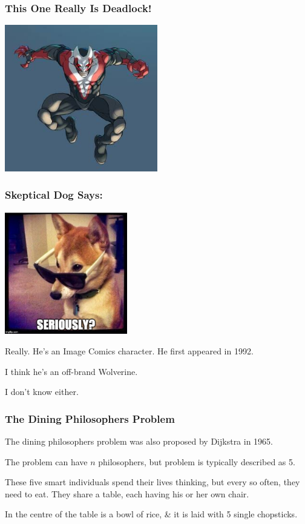 \begin{frame}
	\frametitle{This One Really Is Deadlock!}

	\begin{center}
		\includegraphics[width=0.5\textwidth]{images/deadlock.jpg}
	\end{center}

\end{frame}

\begin{frame}
	\frametitle{Skeptical Dog Says:}

	\begin{center}
		\includegraphics[width=0.4\textwidth]{images/skeptical-dog.jpg}
	\end{center}

	Really. He's an Image Comics character. He first appeared in 1992.

	I think he's an off-brand Wolverine.

	I don't know either.


\end{frame}



\begin{frame}
	\frametitle{The Dining Philosophers Problem}

	The dining philosophers problem was also proposed by Dijkstra in 1965.

	The problem can have $n$ philosophers, but problem is typically described as 5.

	These five smart individuals spend their lives thinking, but every so often, they need to eat. They share a table, each having his or her own chair.

	In the centre of the table is a bowl of rice, \& it is laid with 5 single chopsticks.

\end{frame}

